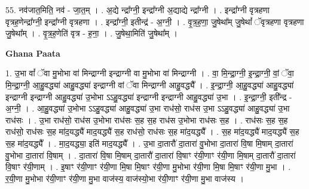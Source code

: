 \documentclass[17pt]{extarticle}
\begin{document}
55. नव॑जात॒मिति॒ नव॑ - जा॒त॒म् । . अ॒द्ये न्द्रा᳚ग्नी॒ इन्द्रा᳚ग्नी अ॒द्याद्ये न्द्रा᳚ग्नी । . इन्द्रा᳚ग्नी वृत्रहणा वृत्रह॒णेन्द्रा᳚ग्नी॒ इन्द्रा᳚ग्नी वृत्रहणा । . इन्द्रा᳚ग्नी॒ इतीन्द्र॑ - अ॒ग्नी॒ । . वृ॒त्र॒ह॒णा॒ जु॒षेथा᳚म् जु॒षेथां᳚ ॅवृत्रहणा वृत्रहणा जु॒षेथा᳚म् । . वृ॒त्र॒ह॒णेति॑ वृत्र - ह॒ना॒ । . जु॒षेथा॒मिति॑ जु॒षेथा᳚म् । \newline

\textbf{Ghana Paata } \newline

1. उ॒भा वां᳚ ॅवा मु॒भोभा वा॑ मिन्द्राग्नी इन्द्राग्नी वा मु॒भोभा वा॑ मिन्द्राग्नी । . वा॒ मि॒न्द्रा॒ग्नी॒ इ॒न्द्रा॒ग्नी॒ वां॒ ॅवा॒ मि॒न्द्रा॒ग्नी॒ आ॒हु॒वद्ध्या॑ आहु॒वद्ध्या॑ इन्द्राग्नी वां ॅवा मिन्द्राग्नी आहु॒वद्ध्यै᳚ । . इ॒न्द्रा॒ग्नी॒ आ॒हु॒वद्ध्या॑ आहु॒वद्ध्या॑ इन्द्राग्नी इन्द्राग्नी आहु॒वद्ध्या॑ उ॒भोभा ऽऽहु॒वद्ध्या॑ इन्द्राग्नी इन्द्राग्नी आहु॒वद्ध्या॑ उ॒भा । . इ॒न्द्रा॒ग्नी॒ इती᳚न्द्र - अ॒ग्नी॒ । . आ॒हु॒वद्ध्या॑ उ॒भोभा ऽऽहु॒वद्ध्या॑ आहु॒वद्ध्या॑ उ॒भा राध॑सो॒ राध॑स उ॒भा ऽऽहु॒वद्ध्या॑ आहु॒वद्ध्या॑ उ॒भा राध॑सः । . उ॒भा राध॑सो॒ राध॑स उ॒भोभा राध॑सः स॒ह स॒ह राध॑स उ॒भोभा राध॑सः स॒ह । . राध॑सः स॒ह स॒ह राध॑सो॒ राध॑सः स॒ह मा॑द॒यद्ध्यै॑ माद॒यद्ध्यै॑ स॒ह राध॑सो॒ राध॑सः स॒ह मा॑द॒यद्ध्यै᳚ । . स॒ह मा॑द॒यद्ध्यै॑ माद॒यद्ध्यै॑ स॒ह स॒ह मा॑द॒यद्ध्यै᳚ । . मा॒द॒यद्ध्या॒ इति॑ माद॒यद्ध्यै᳚ । . उ॒भा दा॒तारौ॑ दा॒तारा॑ वु॒भोभा दा॒तारा॑ वि॒षा मि॒षाम् दा॒तारा॑ वु॒भोभा दा॒तारा॑ वि॒षाम् । . दा॒तारा॑ वि॒षा मि॒षाम् दा॒तारौ॑ दा॒तारा॑ वि॒षाꣳ र॑यी॒णाꣳ र॑यी॒णा मि॒षाम् दा॒तारौ॑ दा॒तारा॑ वि॒षाꣳ र॑यी॒णाम् । . इ॒षाꣳ र॑यी॒णाꣳ र॑यी॒णा मि॒षा मि॒षाꣳ र॑यी॒णा मु॒भोभा र॑यी॒णा मि॒षा मि॒षाꣳ र॑यी॒णा मु॒भा । . र॒यी॒णा मु॒भोभा र॑यी॒णाꣳ र॑यी॒णा मु॒भा वाज॑स्य॒ वाज॑स्यो॒भा र॑यी॒णाꣳ र॑यी॒णा मु॒भा वाज॑स्य । \newline
\end{document}
